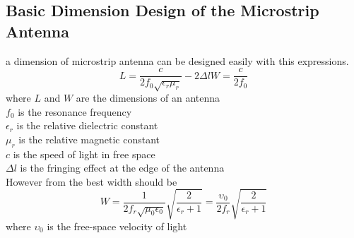 \documentclass[11pt,a4paper]{article}
\begin{document}
    \subsection{Basic Dimension Design of the Microstrip Antenna}
      \indent a dimension of microstrip antenna can be designed easily with this expressions\cite{NoK:05}.
      \begin{equation}
        L = \frac{c}{2f_0\sqrt{\epsilon_r\mu_r}} - 2\Delta l 
        W = \frac{c}{2f_0}
      \end{equation}
      \indent where $L$ and $W$ are the dimensions of an antenna\\[1ex]
      \indent $f_0$ is the resonance frequency\\[1ex]
      \indent $\epsilon_r$ is the relative dielectric constant\\[1ex]
      \indent $\mu_r$ is the relative magnetic constant\\[1ex]
      \indent $c$ is the speed of light in free space\\[1ex]
      \indent $\Delta l$ is the fringing effect at the edge of the antenna\\[3ex]
      \indent However from \cite{CoB:05} the best width should be
      \begin{equation}
        W = \frac {1} {2 f_r \sqrt{\mu_{0} \epsilon_{0}}}\sqrt{\frac{2}{\epsilon_{r} + 1}} = \frac{\upsilon_{0}}{2f_{r}}\sqrt{\frac{2}{\epsilon_{r} + 1}}
      \end{equation}
      \indent where $\upsilon_{0}$ is the free-space velocity of light
    
  \newpage
\end{document}
